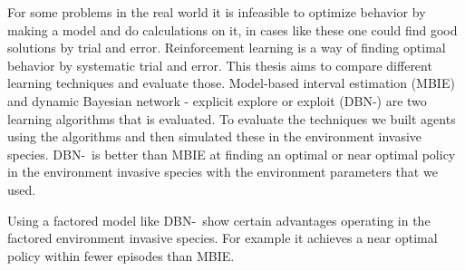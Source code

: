 For some problems in the real world it is infeasible to optimize behavior by making a model and do calculations on it, in cases like these one could find good solutions by trial and error. Reinforcement learning is a way of finding optimal behavior by systematic trial and error.
This thesis aims to compare different learning techniques and evaluate those. 
Model-based interval estimation (MBIE) and dynamic Bayesian network - explicit explore or exploit (DBN-\etre)
 are two learning algorithms that is evaluated. 
To evaluate the techniques we built agents using the algorithms and 
then simulated these in the environment invasive species.
DBN-\etre\ is better than MBIE at finding an optimal or near optimal policy in the 
environment invasive species with the environment parameters that we used.

Using a factored model like DBN-\etre\ show certain advantages operating in 
the factored environment invasive species. For example it achieves a near optimal
policy within fewer episodes than MBIE.






